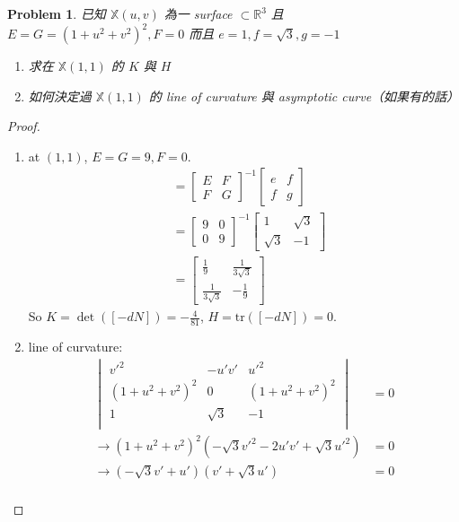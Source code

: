 \documentclass[10pt,a4paper]{article}
\newcounter{theProblemCounter}
\newtheorem{problem}[theProblemCounter]{Problem}
\begin{document}
\setcounter{theProblemCounter}{3}
\begin{problem}
已知 $\mathbb{X}(u, v)$ 為一 surface $\subset \mathbb{R}^3$ 且 $E=G=(1+u^2+v^2)^2, F=0$ 而且 $e=1, f=\sqrt{3}, g=-1$
\begin{enumerate}[{ (}a{)}]
\item 求在 $\mathbb{X}(1, 1)$ 的 $K$ 與 $H$
\item 如何決定過 $\mathbb{X}(1, 1)$ 的 line of curvature 與 asymptotic curve（如果有的話）
\end{enumerate}
\end{problem}
\begin{proof}
\begin{enumerate}[{ (}a{)}]
\item
at $(1,1)$, $E=G=9, F=0$.\\
\begin{align*}
[-dN]&=\begin{bmatrix}E&F\\F&G\end{bmatrix}^{-1}\begin{bmatrix}e&f\\f&g\end{bmatrix}\\
&=\begin{bmatrix}9&0\\0&9\end{bmatrix}^{-1}\begin{bmatrix}1&\sqrt{3}\\\sqrt{3}&-1\end{bmatrix}\\
&=\begin{bmatrix}\frac{1}{9}&\frac{1}{3\sqrt{3}}\\\frac{1}{3\sqrt{3}}&-\frac{1}{9}\end{bmatrix}
\end{align*}
So $K=\det([-dN])=-\frac{4}{81}$, $H=\textrm{tr}([-dN])=0$.
\item
line of curvature:
\begin{align*}
\begin{vmatrix}
v'^2 & -u'v' & u'^2\\
(1+u^2+v^2)^2 & 0 & (1+u^2+v^2)^2\\
1 & \sqrt{3} & -1\\
\end{vmatrix}&=0\\
\rightarrow (1+u^2+v^2)^2(-\sqrt{3}v'^2-2u'v'+\sqrt{3}u'^2)&=0\\
\rightarrow (-\sqrt{3}v'+u')(v'+\sqrt{3}u')&=0\\

\end{align*}
\end{enumerate}
\end{proof}
\end{document}
